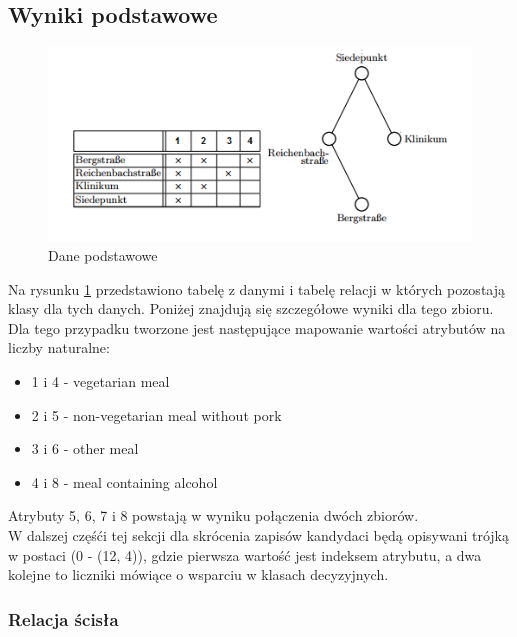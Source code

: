 \documentclass[a4paper,12pt]{article}
\begin{document}
\subsection{Wyniki podstawowe}

\begin{figure}[h!]
\begin{center}
\includegraphics[width=\textwidth]{img/dane.png}
\caption{Dane podstawowe}
\label{dane_podstawowe}
\end{center}
\end{figure}

Na rysunku \ref{dane_podstawowe} przedstawiono tabelę z danymi i tabelę relacji w których pozostają klasy dla tych danych. Poniżej znajdują się szczegółowe wyniki dla tego zbioru.\\

Dla tego przypadku tworzone jest następujące mapowanie wartości atrybutów na liczby naturalne:\\

\begin{itemize}
\item 1 i 4 - vegetarian meal
\item 2 i 5 - non-vegetarian meal without pork
\item 3 i 6 - other meal
\item 4 i 8 - meal containing alcohol
\end{itemize}

Atrybuty 5, 6, 7 i 8 powstają w wyniku połączenia dwóch zbiorów.\\

W dalszej częśći tej sekcji dla skrócenia zapisów kandydaci będą opisywani trójką w postaci (0 - (12, 4)), gdzie pierwsza wartość jest indeksem atrybutu, a dwa kolejne to liczniki mówiące o wsparciu w klasach decyzyjnych.

\subsubsection{Relacja ścisła}
\end{document}
